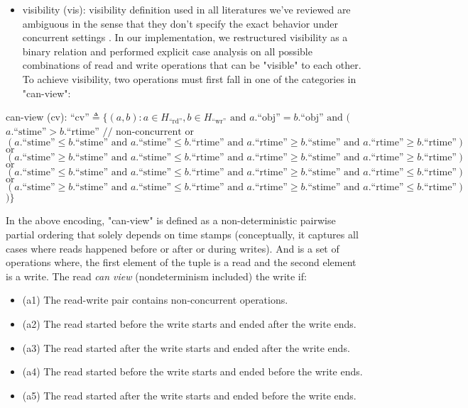 \begin{itemize}
\item visibility (vis): visibility definition used in all literatures we've reviewed
  are ambiguous in the sense that they don't specify the exact behavior under
  concurrent settings \cite{viotti2016consistency} \cite{viotti2016towards} \cite{zhang2018building}
  \cite{ferreira2023antipode}. In our implementation, we restructured visibility as a
  binary relation and performed explicit case analysis on all possible
  combinations of read and write operations that can be "visible" to each other.
  To achieve visibility, two operations must first fall in one of the categories
  in "can-view":
\end{itemize}

can-view (cv): $\text{``cv''} \triangleq \{(a, b) : a \in H_\text{``rd''}, b \in H_\text{``wr''} \text{ and } a.\text{``obj''} = b.\text{``obj''} \text{ and } ($
$a.\text{``stime''} > b.\text{``rtime''} \text{ // non-concurrent}$
$\text{or}$
$(a.\text{``stime''} \leq b.\text{``stime''} \text{ and } a.\text{``stime''} \leq b.\text{``rtime''} \text{ and } a.\text{``rtime''} \geq b.\text{``stime''} \text{ and } a.\text{``rtime''} \geq b.\text{``rtime''})$
$\text{or}$
$(a.\text{``stime''} \geq b.\text{``stime''} \text{ and } a.\text{``stime''} \leq b.\text{``rtime''} \text{ and } a.\text{``rtime''} \geq b.\text{``stime''} \text{ and } a.\text{``rtime''} \geq b.\text{``rtime''})$
$\text{or}$
$(a.\text{``stime''} \leq b.\text{``stime''} \text{ and } a.\text{``stime''} \leq b.\text{``rtime''} \text{ and } a.\text{``rtime''} \geq b.\text{``stime''} \text{ and } a.\text{``rtime''} \leq b.\text{``rtime''})$
$\text{or}$
$(a.\text{``stime''} \geq b.\text{``stime''} \text{ and } a.\text{``stime''} \leq b.\text{``rtime''} \text{ and } a.\text{``rtime''} \geq b.\text{``stime''} \text{ and } a.\text{``rtime''} \leq b.\text{``rtime''})$
$)\}$

In the above encoding, "can-view" is defined as a non-deterministic pairwise
partial ordering that solely depends on time stamps (conceptually, it captures
all cases where reads happened before or after or during writes). And is a set
of operations where, the first element of the tuple is a read and the second
element is a write. The read \textit{can view} (nondeterminism included) the write if:

\begin{itemize}
\item (a1) The read-write pair contains non-concurrent operations.

\item (a2) The read started before the write starts and ended after the write ends.

\item (a3) The read started after the write starts and ended after the write ends.

\item (a4) The read started before the write starts and ended before the write ends.

\item (a5) The read started after the write starts and ended before the write ends.
\end{itemize}

